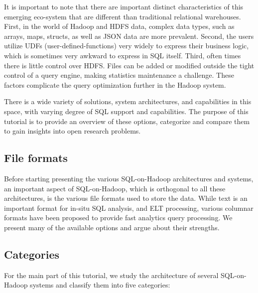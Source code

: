 \documentclass{vldb}
\begin{document}
It is important to note that there are important distinct characteristics of this emerging eco-system that are different than traditional relational warehouses.
First, in the world of Hadoop and HDFS data, complex data types, such as arrays, maps, structs, as well as JSON data are more prevalent.
Second, the users utilize UDFs (user-defined-functions) very widely to express their business logic, which is sometimes very awkward to express in SQL itself. 
Third, often times there is little control over HDFS. Files can be added or modified outside the tight control of a query engine, making statistics maintenance a challenge.
These factors complicate the query optimization further in the Hadoop system. 

There is a wide variety of solutions, system architectures, and capabilities in this space, with varying degree of SQL support and capabilities. The purpose of this tutorial is to provide an overview of these options, categorize and compare them to gain insights into open research problems. 

\subsection{File formats}
Before starting presenting the various SQL-on-Hadoop architectures and systems, an important aspect of SQL-on-Hadoop, which is orthogonal to all these architectures, is the various file formats used to store the data. While text is an important format for in-situ SQL analysis, and ELT processing, various columnar formats have been proposed to provide fast analytics query processing. We present many of the available options and argue about their strengths.

\subsection{Categories}
For the main part of this tutorial, we study the architecture of several SQL-on-Hadoop systems and classify them into five categories:
\end{document}
